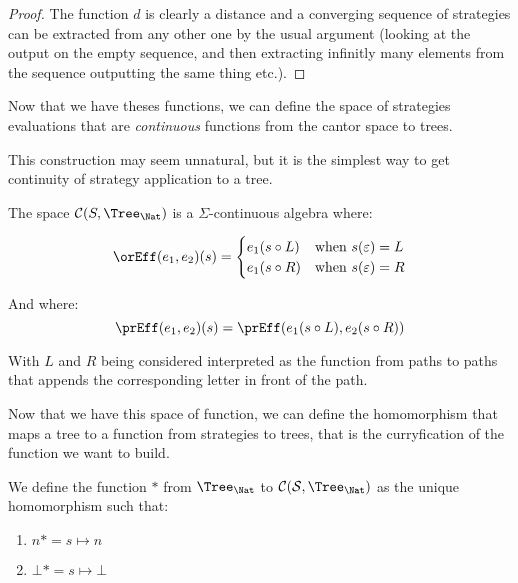 \begin{proof}
    The function $d$ is clearly a distance and a converging sequence 
    of strategies can be extracted from any other one by the usual argument 
    (looking at the output on the empty sequence, and then extracting
    infinitly many elements from the sequence outputting the same thing etc.).
\end{proof}

Now that we have theses functions, we can define the space 
of strategies evaluations that are \emph{continuous}
functions from the cantor space to trees. 

This construction may seem unnatural, but it is the simplest 
way to get continuity of strategy application to a tree.

\begin{adefinition}
    The space $\mathcal{C}(S,\Tree_\Nat)$ is a $\Sigma$-continuous 
    algebra where:

    \begin{equation*}
        \orEff (e_1,e_2) (s) = 
        \begin{cases}
            e_1 (s \circ L) & \text{when } s(\varepsilon) = L \\
            e_1 (s \circ R) & \text{when } s(\varepsilon) = R 
        \end{cases}
    \end{equation*}

    And where:
    \begin{equation*}
        \prEff (e_1,e_2) (s) = \prEff (e_1 (s \circ L), e_2 (s \circ R)) 
    \end{equation*}

    With $L$ and $R$ being considered interpreted as the function 
    from paths to paths that appends the corresponding letter in front of 
    the path.
\end{adefinition}

Now that we have this space of function, we can define the 
homomorphism that maps a tree to a function from strategies 
to trees, that is the curryfication of the function we want to build.

\begin{adefinition}
    We define the function $*$ from $\Tree_\Nat$ to $\mathcal{C}(\mathcal{S},\Tree_\Nat)$
    as the unique homomorphism such that:

    \begin{enumerate}
        \item $n* = s \mapsto n$
        \item $\bot* = s \mapsto \bot$
    \end{enumerate}
\end{adefinition}

